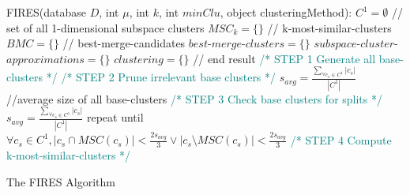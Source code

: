 \IncMargin{1em}
\begin{algorithm}[H]
	\DontPrintSemicolon
	FIRES(database $D$, int $ \mu $, int $ k $, int $ minClu $, object clusteringMethod):\;
	$C^{1} = \emptyset$	// set of all 1-dimensional subspace clusters\;
	$MSC_{k} = \{\}$ // k-most-similar-clusters\;
	$BMC = \{\}$ // best-merge-candidates\;
	$best$-$merge$-$clusters = \{\}$\;
	$subspace$-$cluster$-$approximations = \{\}$\;
	$clustering = \{\}$ // end result\;
	\textcolor{teal}{/* STEP 1 Generate all base-clusters */\;}
	\textcolor{teal}{/* STEP 2 Prune irrelevant base clusters */\;}
	$s_{avg} = \frac{\sum _{\forall c_{s}\in C^{1}}|c_{s}|}{|C^{1}|}$ //average size of all base-clusters\;
	\textcolor{teal}{/* STEP 3 Check base clusters for splits */\;}
	$s_{avg} = \frac{\sum _{\forall c_{s}\in C^{1}}|c_{s}|}{|C^{1}|}$\;
	repeat {\;  
		 until {\;
			$\forall c_{s} \in C^{1}, |c_{s} \cap MSC(c_{s})| < \frac{2s_{avg}}{3} \lor |c_{s} \setminus MSC(c_{s})| < \frac{2s_{avg}}{3}$\;
		}
	}
	\textcolor{teal}{/* STEP 4 Compute k-most-similar-clusters */\;}
	\caption{The FIRES Algorithm}\label{alg:fires}
\end{algorithm}
\IncMargin{1em}
